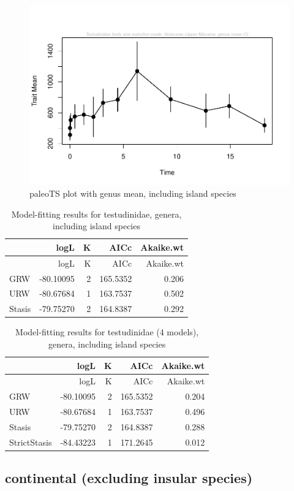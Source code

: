 \documentclass[]{article}
\begin{document}
\begin{figure}[htbp]
\centering
\includegraphics{MA_JJ_files/figure-latex/paleoTS plot with genus mean, including island species-1.pdf}
\caption{paleoTS plot with genus mean, including island species}
\end{figure}

\begin{longtable}[]{@{}lrrrr@{}}
\caption{Model-fitting results for testudinidae, genera, including
island species}\tabularnewline
\toprule
& logL & K & AICc & Akaike.wt\tabularnewline
\midrule
\endfirsthead
\toprule
& logL & K & AICc & Akaike.wt\tabularnewline
\midrule
\endhead
GRW & -80.10095 & 2 & 165.5352 & 0.206\tabularnewline
URW & -80.67684 & 1 & 163.7537 & 0.502\tabularnewline
Stasis & -79.75270 & 2 & 164.8387 & 0.292\tabularnewline
\bottomrule
\end{longtable}

\begin{longtable}[]{@{}lrrrr@{}}
\caption{Model-fitting results for testudinidae (4 models), genera,
including island species}\tabularnewline
\toprule
& logL & K & AICc & Akaike.wt\tabularnewline
\midrule
\endfirsthead
\toprule
& logL & K & AICc & Akaike.wt\tabularnewline
\midrule
\endhead
GRW & -80.10095 & 2 & 165.5352 & 0.204\tabularnewline
URW & -80.67684 & 1 & 163.7537 & 0.496\tabularnewline
Stasis & -79.75270 & 2 & 164.8387 & 0.288\tabularnewline
StrictStasis & -84.43223 & 1 & 171.2645 & 0.012\tabularnewline
\bottomrule
\end{longtable}

\newpage

\subsection{continental (excluding insular
species)}\label{continental-excluding-insular-species}
\end{document}
